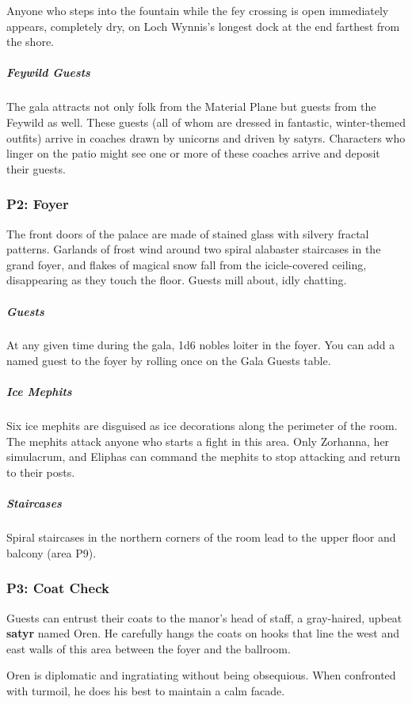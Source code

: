 \documentclass[10pt,a4paper,twoside,bg=print,twocolumn,openany,nodeprecatedcode]{dndbook}
\begin{document}
Anyone who steps into the fountain while the fey crossing is open immediately appears, completely dry, on Loch Wynnis's longest dock at the end farthest from the shore.

\subparagraph{Feywild Guests}
The gala attracts not only folk from the Material Plane but guests from the Feywild as well. These guests (all of whom are dressed in fantastic, winter-themed outfits) arrive in coaches drawn by unicorns and driven by satyrs. Characters who linger on the patio might see one or more of these coaches arrive and deposit their guests.

\subsubsection{P2: Foyer}
\begin{DndReadAloud}{}
The front doors of the palace are made of stained glass with silvery fractal patterns. Garlands of frost wind around two spiral alabaster staircases in the grand foyer, and flakes of magical snow fall from the icicle-covered ceiling, disappearing as they touch the floor. Guests mill about, idly chatting.

\end{DndReadAloud}

\subparagraph{Guests}
At any given time during the gala, 1d6 nobles loiter in the foyer. You can add a named guest to the foyer by rolling once on the Gala Guests table.

\subparagraph{Ice Mephits}
Six ice mephits are disguised as ice decorations along the perimeter of the room. The mephits attack anyone who starts a fight in this area. Only Zorhanna, her simulacrum, and Eliphas can command the mephits to stop attacking and return to their posts.

\subparagraph{Staircases}
Spiral staircases in the northern corners of the room lead to the upper floor and balcony (area P9).

\subsubsection{P3: Coat Check}
Guests can entrust their coats to the manor's head of staff, a gray-haired, upbeat \textbf{satyr} named Oren. He carefully hangs the coats on hooks that line the west and east walls of this area between the foyer and the ballroom.

Oren is diplomatic and ingratiating without being obsequious. When confronted with turmoil, he does his best to maintain a calm facade.
\end{document}
